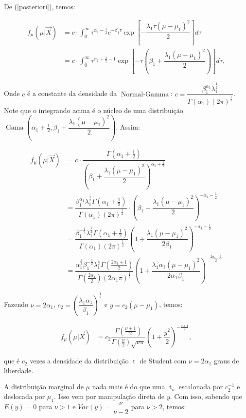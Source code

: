 \documentclass[a4paper]{article}
\newcommand{\op}[1]{{\operatorname{#1}}}
\newcommand{\vX}{\vec X}
\begin{document}
De (\ref{posteriori}), temos:

\begin{align*}
f_{\mu}(\mu|\vX) &= c\cdot\int_{0}^{\infty} \tau^{\alpha_1-\frac12}e^{-\beta_1\tau}\exp{\left[-\dfrac{\lambda_1\tau(\mu-\mu_1)^2}{2}\right]} d\tau\\
&=c\cdot\int_{0}^{\infty}\tau^{\alpha_1+\frac12-1}\exp{\left[-\tau\left(\beta_1+\dfrac{\lambda_1(\mu-\mu_1)^2}{2}\right)\right]}d\tau,
\end{align*}

Onde $c$ é a constante da densidade da $\op{Normal-Gamma}$: $c=\dfrac{\beta_1^{\alpha_1}\lambda_1^{\frac12}}{\Gamma(\alpha_1)(2\pi)^{\frac12}}$.
Note que o integrando acima é o núcleo de uma distribuição $\op{Gama}\left(\alpha_1+\frac12,\beta_1+\dfrac{\lambda_1(\mu-\mu_1)^2}{2}\right)$. Assim:

\begin{align*}
	f_{\mu}(\mu|\vX)&=c\cdot \dfrac{\Gamma(\alpha_1+\frac12)}{\left(\beta_1+\dfrac{\lambda_1(\mu-\mu_1)^2}{2}\right)^{\alpha_1+\frac12}}\\
	&=\dfrac{\beta_1^{\alpha_1}\lambda_1^{\frac12}\Gamma{(\alpha_1+\frac12)}}{\Gamma(\alpha_1)(2\pi)^{\frac12}}\cdot \left(\beta_1+\dfrac{\lambda_1(\mu-\mu_1)^2}{2}\right)^{-\alpha_1-\frac12}\\
	&=\dfrac{\beta_1^{-\frac12}\lambda_1^{\frac12}\Gamma{(\alpha_1+\frac12)}}{\Gamma(\alpha_1)(2\pi)^{\frac12}}\left(1+\dfrac{\lambda_1(\mu-\mu_1)^2}{2\beta_1}\right)^{-\alpha_1-\frac12}\\
	&=\dfrac{\alpha_1^{\frac12}\beta_1^{-\frac12}\lambda_1^{\frac12}\Gamma{(\frac{2\alpha_1+1}{2})}}{\Gamma(\frac{2\alpha_1}{2})(2\alpha_1\pi)^{\frac12}}\left(1+\dfrac{\lambda_1\alpha_1(\mu-\mu_1)^2}{2\alpha_1\beta_1}\right)^{-\frac{2\alpha_1-1}2}
\end{align*}

Fazendo $\nu=2\alpha_1$, $c_2=\left(\dfrac{\lambda_1\alpha_1}{\beta_1}\right)^{\frac12}$ e  $y=c_2(\mu-\mu_1)$, temos:

\begin{align*}
f_{\mu}(\mu|\vX)&=c_2\dfrac{\Gamma(\frac{\nu+1}{2})}{\Gamma(\frac{\nu}{2})\sqrt{\nu\pi}}\left(1+\dfrac{y^2}{2}\right)^{-\frac{\nu+1}2},
\end{align*}

que é $c_2$ vezes a densidade da distribuição $\op{t}$ de Student\citep{wiki:Student-distribution} com $\nu=2\alpha_1$ graus de liberdade.

A distribuição marginal de $\mu$ nada mais é do que uma $\op{t}_{\nu}$ escalonada por $c_2^{-1}$ e deslocada por $\mu_1$. Isso vem por manipulação direta de $y$. Com isso, sabendo que $E(y)=0$ para $\nu>1$ e $Var(y)=\dfrac{\nu}{\nu-2}$ para $\nu>2$, temos:
\end{document}
